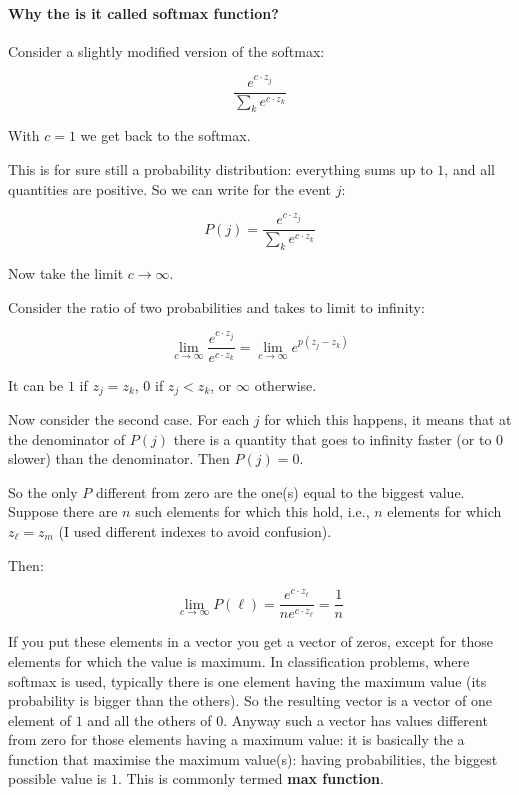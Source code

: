 \documentclass[12pt, letterpaper]{article}
\theoremstyle{definition}
\let\tb\textbf
\begin{document}
\paragraph{\tb{Why the is it called \tb{softmax function?}}}Consider a slightly modified version of the softmax: 

$$\frac{e^{c\cdot z_j}}{\sum_k e^{c\cdot z_k}}$$

With $c=1$ we get back to the softmax.

This is for sure still a probability distribution: everything sums up to $1$, and all quantities are positive. So we can write for the event $j$:

$$P(j) = \frac{e^{c\cdot z_j}}{\sum_k e^{c\cdot z_k}}$$

Now take the limit $c\rightarrow\infty$.

Consider the ratio of two probabilities and takes to limit to infinity:

$$\lim_{c\rightarrow \infty}\frac{e^{c\cdot z_j}}{e^{c\cdot z_k}} = \lim_{c\rightarrow \infty} e^{p(z_j-z_k)}$$

It can be $1$ if $z_j=z_k$, $0$ if $z_j<z_k$, or $\infty$ otherwise.

Now consider the second case. For each $j$ for which this happens, it means that at the denominator of $P(j)$ there is a quantity that goes to infinity faster (or to $0$ slower) than the denominator. Then $P(j)=0$.

So the only $P$ different from zero are the one(s) equal to the biggest value. Suppose there are $n$ such elements for which this hold, i.e., $n$ elements for which $z_\ell=z_m$ (I used different indexes to avoid confusion).

Then:

$$\lim_{c\rightarrow \infty} P(\ell) = \frac{e^{c\cdot z_\ell}}{n e^{c\cdot z_\ell}}  = \frac{1}{n}$$

If you put these elements in a vector you get a vector of zeros, except for those elements for which the value is maximum. In classification problems, where softmax is used, typically there is one element having the maximum value (its probability is bigger than the others). So the resulting vector is a vector of one element of $1$ and all the others of $0$. Anyway such a vector has values different from zero for those elements having a maximum value: it is basically the a function that maximise the maximum value(s): having probabilities, the biggest possible value is $1$. This is commonly termed \tb{max function}. 
\end{document}
